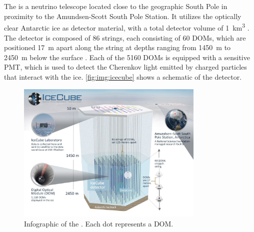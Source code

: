 \section{\icecube{}}
The \icecubeneutrinoobservatory{} is a neutrino telescope
  located close to the geographic South Pole
  in proximity to the Amundsen-Scott South Pole Station.
It utilizes the optically clear Antarctic ice as detector material,
  with a total detector volume of \SI{1}{\cubic\kilo\meter} \cite{icecube_aartsen}.
The detector is composed of \num{86} strings,
  each consisting of \num{60} \acp{DOM},
    which are positioned
      \SI{17}{\meter} apart along the string
      at depths ranging from \SI{1450}{\meter} to \SI{2450}{\meter} below the surface \cite{icecube_aartsen}.
Each of the \num{5160} \acp{DOM} is equipped with a sensitive \ac{PMT},
  which is used to detect the Cherenkov light emitted by charged particles
  that interact with the ice.
%
\autoref{fig:img:icecube} shows a schematic of the \icecube{} detector.



\begin{figure}
  \centering
  \includegraphics[width=0.8\textwidth]{content/img/icecube_detector_schematic.jpg}
  \caption{
    Infographic
    of the \icecubeneutrinoobservatory{} \cite{icecube_homepage}.
    Each dot represents a \ac{DOM}.
  }
  \label{fig:img:icecube}
\end{figure}



